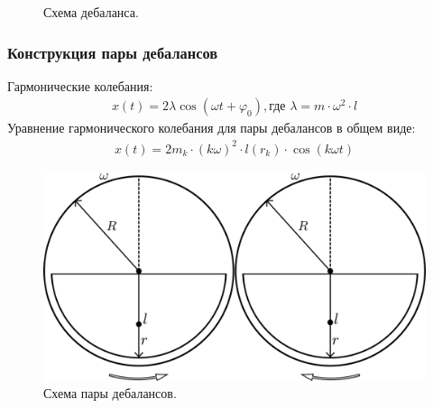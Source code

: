 \documentclass[10pt, pdf, hyperref={unicode}]{beamer}
\begin{document}
\begin{frame}
\begin{center}
\begin{minipage}[h]{0.97\linewidth}
\begin{minipage}[h]{0.36\linewidth}
\begin{figure}[h]
                        \caption{Схема дебаланса.}
                    \end{figure}
                \end{minipage}
            \end{minipage}
        \end{center}
    \end{frame}


    \begin{frame}
        \frametitle{Конструкция пары дебалансов}
        \begin{center}
            \begin{minipage}[h]{0.97\linewidth}
                Гармонические колебания:
                \begin{equation}
                    \begin{gathered}
                        x(t) = 2 \lambda \cos (\omega t + \varphi_0), \textrm{где } \lambda = m \cdot \omega^2 \cdot l
                    \end{gathered}
                \end{equation}
                Уравнение гармонического колебания для пары дебалансов в общем виде:
                \begin{equation}
                    \begin{aligned}
                        x(t) = 2 m_k \cdot (k \omega)^2 \cdot l(r_k) \cdot \cos (k \omega t)
                    \end{aligned}
                \end{equation}
                \begin{figure}[h]
                    \centering
                    \includegraphics[width=0.52\linewidth]{../img/double_debalance.png}
                    \caption{Схема пары дебалансов.}
                \end{figure}
            \end{minipage}
        \end{center}
    \end{frame}
\end{document}
